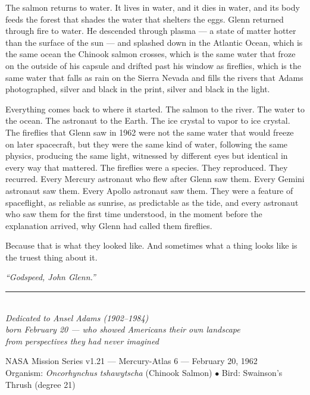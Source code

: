 \documentclass[12pt, letterpaper]{article}
\begin{document}
The salmon returns to water. It lives in water, and it dies in water, and its body feeds the forest that shades the water that shelters the eggs. Glenn returned through fire to water. He descended through plasma --- a state of matter hotter than the surface of the sun --- and splashed down in the Atlantic Ocean, which is the same ocean the Chinook salmon crosses, which is the same water that froze on the outside of his capsule and drifted past his window as fireflies, which is the same water that falls as rain on the Sierra Nevada and fills the rivers that Adams photographed, silver and black in the print, silver and black in the light.

Everything comes back to where it started. The salmon to the river. The water to the ocean. The astronaut to the Earth. The ice crystal to vapor to ice crystal. The fireflies that Glenn saw in 1962 were not the same water that would freeze on later spacecraft, but they were the same kind of water, following the same physics, producing the same light, witnessed by different eyes but identical in every way that mattered. The fireflies were a species. They reproduced. They recurred. Every Mercury astronaut who flew after Glenn saw them. Every Gemini astronaut saw them. Every Apollo astronaut saw them. They were a feature of spaceflight, as reliable as sunrise, as predictable as the tide, and every astronaut who saw them for the first time understood, in the moment before the explanation arrived, why Glenn had called them fireflies.

Because that is what they looked like. And sometimes what a thing looks like is the truest thing about it.

\begin{center}
\textit{``Godspeed, John Glenn.''}
\end{center}

\vspace{2em}
\begin{center}
\rule{3cm}{0.4pt}\\[1em]
\textit{Dedicated to Ansel Adams (1902--1984)\\born February 20 --- who showed Americans their own landscape\\from perspectives they had never imagined}
\end{center}

\vspace{2em}
\begin{center}
\small
NASA Mission Series v1.21 --- Mercury-Atlas 6 --- February 20, 1962\\
Organism: \textit{Oncorhynchus tshawytscha} (Chinook Salmon) $\bullet$ Bird: Swainson's Thrush (degree 21)
\end{center}
\end{document}
